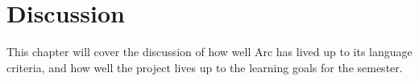 \chapter{Discussion}\label{cha:discussion}

This chapter will cover the discussion of how well Arc has lived up to its language criteria, and how well the project lives up to the learning goals for the semester.





%

